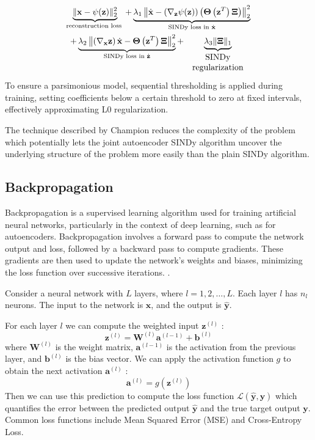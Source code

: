 \begin{align}
    \underbrace{\|\mathbf{x}-\psi(\mathbf{z})\|_2^2}_{\text {reconstruction loss }}
    +\underbrace{\lambda_1\left\|\dot{\mathbf{x}}-\left(\nabla_{\mathbf{z}} \psi(\mathbf{z})\right)\left(\boldsymbol{\Theta}\left(\mathbf{z}^T\right) \boldsymbol{\Xi}\right)\right\|_2^2}_{\text {SINDy loss in } \dot{\mathbf{x}}} \notag 
    \\
    +\underbrace{\lambda_2\left\|\left(\nabla_{\mathbf{x}} \mathbf{z}\right) \dot{\mathbf{x}}-\boldsymbol{\Theta}\left(\mathbf{z}^T\right) \boldsymbol{\Xi}\right\|_2^2}_{\text {SINDy loss in } \dot{\mathbf{z}}}+\underbrace{\lambda_3\|\boldsymbol{\Xi}\|_1}_{\begin{array}{c}\text { SINDy } \\ \text { regularization }\end{array}}
\end{align}
To ensure a parsimonious model, sequential thresholding is applied during training, setting coefficients below a certain threshold to zero at fixed intervals, effectively approximating L0 regularization.

The technique described by Champion reduces the complexity of the problem which potentially lets the joint autoencoder SINDy algorithm uncover the underlying structure of the problem more easily than the plain SINDy algorithm.

\subsection{Backpropagation}
Backpropagation is a supervised learning algorithm used for training artificial neural networks, particularly in the context of deep learning, such as for autoencoders. Backpropagation involves a forward pass to compute the network output and loss, followed by a backward pass to compute gradients. These gradients are then used to update the network's weights and biases, minimizing the loss function over successive iterations. \cite{backprop}. 

Consider a neural network with $L$ layers, where $l=1,2, \ldots, L$. Each layer $l$ has $n_l$ neurons. The input to the network is $\mathbf{x}$, and the output is $\hat{\mathbf{y}}$.

For each layer $l$ we can compute the weighted input $\mathbf{z}^{(l)}$ :
$$
\mathbf{z}^{(l)}=\mathbf{W}^{(l)} \mathbf{a}^{(l-1)}+\mathbf{b}^{(l)}
$$
where $\mathbf{W}^{(l)}$ is the weight matrix, $\mathbf{a}^{(l-1)}$ is the activation from the previous layer, and $\mathbf{b}^{(l)}$ is the bias vector. We can apply the activation function $g$ to obtain the next activation $\mathbf{a}^{(l)}$ :
$$
\mathbf{a}^{(l)}=g\left(\mathbf{z}^{(l)}\right)
$$
Then we can use this prediction to compute the loss function $\mathcal{L}(\hat{\mathbf{y}}, \mathbf{y})$ which quantifies the error between the predicted output $\hat{\mathbf{y}}$ and the true target output $\mathbf{y}$. Common loss functions include Mean Squared Error (MSE) and Cross-Entropy Loss. 

